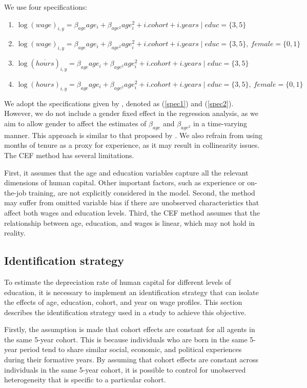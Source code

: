 \documentclass[12pt]{article}
\begin{document}
We use four specifications:
\begin{enumerate}
    \item   \label{spec1}    \(\log(wage)_{i,y}=   \beta_{age} age_{i}+ \beta_{age^2} age_{i}^2+i.cohort+i.years \mid educ=\{3,5\}\)
    \item   \label{spec2}    \(\log(wage)_{i,y}=   \beta_{age} age_{i}+ \beta_{age^2} age_{i}^2+i.cohort+i.years \mid educ=\{3,5\},\ female=
    \{0,1\}\)
    \item  \label{spec3}    \(\log(\overline{hours})_{i,y}=  \beta_{age} age_{i}+ \beta_{age^2} age_{i}^2+i.cohort+i.years \mid educ=\{3,5\}\)
    \item   \label{spec4}    \(\log(hours)_{i,y}= \beta_{age} age_{i}+ \beta_{age^2} age_{i}^2+i.cohort+i.years \mid educ=\{3,5\},\ female=
    \{0,1\}\)
\end{enumerate}
We adopt the specifications given by \citet{hendricks2013ben}, denoted as (\ref{spec1}) and (\ref{spec2}). However, we do
not include a gender fixed effect in the regression analysis, as we aim to allow gender to affect the estimates of
$\beta_{age}$ and $\beta_{age^2}$ in a time-varying manner. This approach is similar to that proposed by
\citet{joshi2021gender}. We also refrain from using months of tenure as a proxy for experience, as it may result in
collinearity issues. The CEF method has several limitations.
\par
First, it assumes that the age and education variables capture all the relevant dimensions of human
capital. Other important factors, such as experience or on-the-job training, are not
explicitly considered in the model. Second, the method may suffer from omitted variable bias if there are unobserved
characteristics that affect both wages and education levels. Third, the CEF method assumes that the relationship between
age, education, and wages is linear, which may not hold in reality. 

\subsection{Identification strategy}
To estimate the depreciation rate of human capital for different levels of education, it is necessary to
implement an identification strategy that can isolate the effects of age, education, cohort, and year on wage profiles.
This section describes the identification strategy used in a study to achieve this objective.
\par
Firstly, the assumption is made that cohort effects are constant for all agents in the same 5-year cohort. This is
because individuals who are born in the same 5-year period tend to share similar social, economic, and political
experiences during their formative years. By assuming that cohort effects are constant across individuals in the same
5-year cohort, it is possible to control for unobserved heterogeneity that is specific to a particular cohort.
\end{document}
